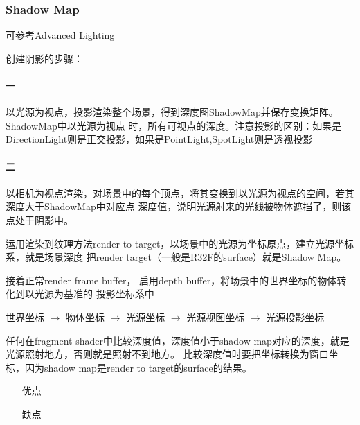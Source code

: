 \subsubsection{Shadow Map}

可参考Advanced Lighting\cite{LearnOpenGL}

创建阴影的步骤：
\paragraph{一} 
以光源为视点，投影渲染整个场景，得到深度图ShadowMap并保存变换矩阵。ShadowMap中以光源为视点
时，所有可视点的深度。注意投影的区别：如果是DirectionLight则是正交投影，如果是PointLight,SpotLight则是透视投影

\paragraph{二}
以相机为视点渲染，对场景中的每个顶点，将其变换到以光源为视点的空间，若其深度大于ShadowMap中对应点
深度值，说明光源射来的光线被物体遮挡了，则该点处于阴影中。

运用渲染到纹理方法render to target，以场景中的光源为坐标原点，建立光源坐标系，就是场景深度
把render target（一般是R32F的surface）就是Shadow Map。 

接着正常render frame buffer， 启用depth buffer，将场景中的世界坐标的物体转化到以光源为基准的
投影坐标系中

世界坐标 $\rightarrow$ 物体坐标 $\rightarrow$ 光源坐标 $\rightarrow$ 光源视图坐标 $\rightarrow$ 光源投影坐标

任何在fragment shader中比较深度值，深度值小于shadow map对应的深度，就是光源照射地方，否则就是照射不到地方。
比较深度值时要把坐标转换为窗口坐标，因为shadow map是render to target的surface的结果。

\begin{itemize}
    \item [优点] 
    \item [缺点] 
\end{itemize}

